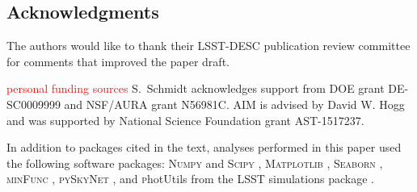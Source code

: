 \documentclass[\docopts]{\docclass}
\newcommand{\code}[1]{}{\texttt{#1}}
\newcommand{\red}[1]{\textcolor{red}{#1}}
\begin{document}








%


\subsection*{Acknowledgments}






The authors would like to thank their LSST-DESC publication review committee for comments that improved the paper draft.

{ \red{personal funding sources}}
S.~Schmidt acknowledges support from DOE grant DE-SC0009999 and NSF/AURA grant N56981C.  AIM is advised by David W. Hogg and was supported by National Science Foundation grant AST-1517237.

In addition to packages cited in the text, analyses performed in this paper used the following software packages: \textsc{Numpy} and \textsc{Scipy} \citep{numpyscipy}, \textsc{Matplotlib} \citep{matplotlib}, \textsc{Seaborn} \citep{seaborn}, \textsc{minFunc} \citep{minfunc}, \textsc{pySkyNet} \citep{pyskynet}, and {\textsc photUtils} from the LSST simulations package \citep{lsstphotutils}.


\end{document}
